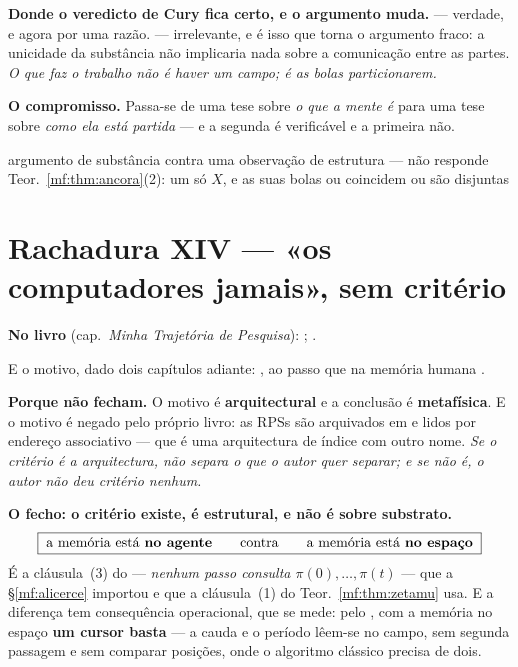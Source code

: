 \documentclass[../livro.tex]{subfiles}
\begin{document}
\medskip\noindent\textbf{Donde o veredicto de Cury fica certo, e o argumento
muda.}  --- verdade, e agora por uma razão.
 --- irrelevante, e é isso que torna o argumento
fraco: a unicidade da substância não implicaria nada sobre a comunicação entre as
partes. \emph{O que faz o trabalho não é haver um campo; é as bolas
particionarem.}

\medskip\noindent\textbf{O compromisso.} Passa-se de uma tese sobre \emph{o que a
mente é} para uma tese sobre \emph{como ela está partida} --- e a segunda é
verificável e a primeira não.

      {argumento de substância contra uma observação de estrutura --- não
       responde}
      {Teor.~\ref{mf:thm:ancora}(2): um só $X$, e as suas bolas ou coincidem ou
       são disjuntas}

\section{Rachadura XIV --- «os computadores jamais», sem critério}\label{mf:r14}

\noindent\textbf{No livro} (cap.~\emph{Minha Trajetória de Pesquisa}): ; .

\noindent E o motivo, dado dois capítulos adiante: ,
ao passo que na memória humana .

\medskip\noindent\textbf{Porque não fecham.} O motivo é \textbf{arquitectural} e
a conclusão é \textbf{metafísica}. E o motivo é negado pelo próprio livro: as
RPSs são  arquivados em
 e lidos por endereço associativo
--- que é uma arquitectura de índice com outro nome. \emph{Se o critério é a
arquitectura, não separa o que o autor quer separar; e se não é, o autor não deu
critério nenhum.}

\medskip\noindent\textbf{O fecho: o critério existe, é estrutural, e não é sobre
substrato.}
\[
\boxed{\;\text{a memória está \textbf{no agente}}
\qquad\text{contra}\qquad
\text{a memória está \textbf{no espaço}}\;}
\]
É a cláusula~(3) do  ---
\emph{nenhum passo consulta $\pi(0),\dots,\pi(t)$} --- que a §\ref{mf:alicerce}
importou e que a cláusula~(1) do Teor.~\ref{mf:thm:zetamu} usa. E a diferença tem
consequência operacional, que se mede: pelo
, com a memória no espaço
\textbf{um cursor basta} --- a cauda e o período lêem-se no campo, sem segunda
passagem e sem comparar posições, onde o algoritmo clássico precisa de dois.
\end{document}

